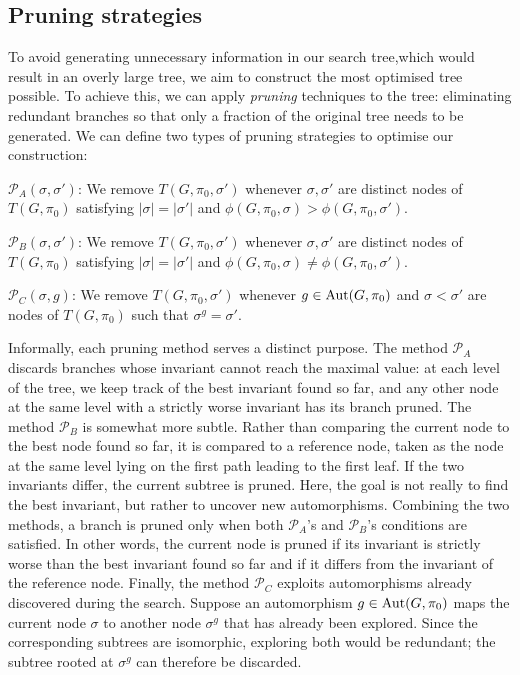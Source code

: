 \subsection{Pruning strategies}

To avoid generating unnecessary information in our search tree,which would result in an overly large tree, we aim to construct the most optimised tree possible. To achieve this, we can apply \textit{pruning} techniques to the tree: eliminating redundant branches so that only a fraction of the original tree needs to be generated. We can define two types of pruning strategies to optimise our construction:

$\mathcal{P}_A(\sigma, \sigma')$: We remove $T(G, \pi_0, \sigma')$ whenever $\sigma, \sigma'$ are distinct nodes of $T(G, \pi_0)$ satisfying $|\sigma| = |\sigma'|$ and $\phi(G,\pi_0,\sigma) > \phi(G,\pi_0,\sigma')$.

$\mathcal{P}_B(\sigma, \sigma')$: We remove $T(G, \pi_0, \sigma')$ whenever $\sigma, \sigma'$ are distinct nodes of $T(G, \pi_0)$ satisfying $|\sigma| = |\sigma'|$ and $\phi(G,\pi_0,\sigma) \neq \phi(G,\pi_0,\sigma')$.

$\mathcal{P}_C(\sigma, g)$: We remove $T(G, \pi_0, \sigma')$ whenever $g \in \operatorname{Aut}(G,\pi_0)$ and $\sigma < \sigma'$ are nodes of $T(G, \pi_0)$ such that $\sigma^g = \sigma'$.

Informally, each pruning method serves a distinct purpose. The method $\mathcal{P}_A$ discards branches whose invariant cannot reach the maximal value: at each level of the tree, we keep track of the best invariant found so far, and any other node at the same level with a strictly worse invariant has its branch pruned. The method $\mathcal{P}_B$ is somewhat more subtle. Rather than comparing the current node to the best node found so far, it is compared to a reference node, taken as the node at the same level lying on the first path leading to the first leaf. If the two invariants differ, the current subtree is pruned. Here, the goal is not really to find the best invariant, but rather to uncover new automorphisms. Combining the two methods, a branch is pruned only when both $\mathcal{P}_A$'s and $\mathcal{P}_B$'s conditions are satisfied. 
In other words, the current node is pruned if its invariant is strictly 
worse than the best invariant found so far and if it differs from the 
invariant of the reference node. Finally, the method $\mathcal{P}_C$ exploits automorphisms already discovered during the search. Suppose an automorphism $g \in \operatorname{Aut}(G,\pi_0)$ maps the current node $\sigma$ to another node $\sigma^g$ that has already been explored. Since the corresponding subtrees are isomorphic, exploring both would be redundant; the subtree rooted at $\sigma^g$ can therefore be discarded.


